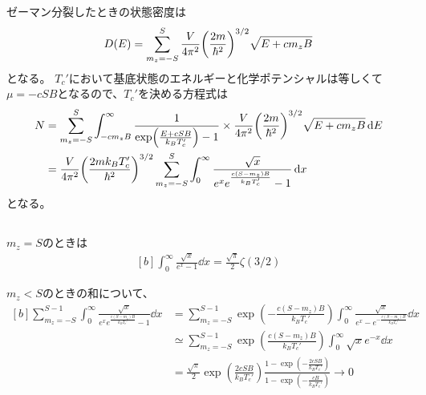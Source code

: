 \documentclass[../../sp_2021.tex]{subfiles}
\begin{document}
\subsection{}
ゼーマン分裂したときの状態密度は
\begin{equation}\begin{aligned}[b]
    D(E)=\sum_{m_z=-S}^{S}\frac{V}{4\pi^2}\qty(\frac{2m}{\hbar^2})^{3/2}\sqrt{E+cm_zB}
\end{aligned}\end{equation}
となる。
\(T_c'\)において基底状態のエネルギーと化学ポテンシャルは等しくて\(\mu=-cSB\)となるので、\(T_c'\)を決める方程式は
\begin{equation}\begin{aligned}[b]
    N &= \sum_{m_z=-S}^{S}\int_{-cm_zB}^{\infty}\frac{1}{\exp(\frac{E+cSB}{k_BT_c'})-1}\times \frac{V}{4\pi^2}\qty(\frac{2m}{\hbar^2})^{3/2}\sqrt{E+cm_zB} \dd{E}\\
    &= \frac{V}{4\pi^2}\qty(\frac{2mk_BT_c'}{\hbar^2})^{3/2}\sum_{m_z=-S}^{S}\int_{0}^{\infty} \frac{\sqrt{x}}{e^xe^{\frac{c(S-m_z)B}{k_BT_c'}}-1}\dd{x}
\end{aligned}\end{equation}
となる。

\subsection{}
\(m_z=S\)のときは
\begin{equation}\begin{aligned}[b]
    \int_{0}^{\infty}\frac{\sqrt{x}}{e^x-1}\dd{x} = \frac{\sqrt{\pi}}{2}\zeta(3/2)
\end{aligned}\end{equation}

\(m_z<S\)のときの和について、
\begin{equation}\begin{aligned}[b]
    \sum_{m_z=-S}^{S-1}\int_{0}^{\infty} \frac{\sqrt{x}}{e^xe^{\frac{c(S-m_z)B}{k_BT_c'}}-1}\dd{x}
    &=\sum_{m_z=-S}^{S-1}\exp(-\frac{c(S-m_z)B}{k_BT_c'})\int_{0}^{\infty} \frac{\sqrt{x}}{e^x-e^{-\frac{c(S-m_z)B}{k_BT_c'}}}\dd{x}\\
    &\simeq\sum_{m_z=-S}^{S-1}\exp(\frac{c(S-m_z)B}{k_BT_c'})\int_{0}^{\infty} \sqrt{x}e^{-x}\dd{x}\\
    &= \frac{\sqrt{\pi}}{2}\exp(\frac{2cSB}{k_BT_c'})\frac{1-\exp(-\frac{2cSB}{k_BT_c'})}{1-\exp(-\frac{cB}{k_BT_c'})}\to 0
\end{aligned}\end{equation}
\end{document}
